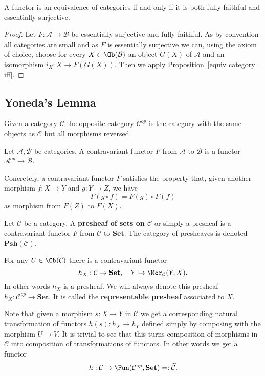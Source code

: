 \begin{corollary}
A functor is an equivalence of categories if and only if it is both fully faithful and essentially surjective.
\end{corollary}
\begin{proof}
Let $F:\mathcal{A}\to\mathcal{B}$ be essentially surjective and fully faithful. As by convention all categories are small and as $F$ is essentially surjective we can, using the axiom of choice, choose for every $X\in\Ob(\mathcal{B})$ an object $G(X)$ of $\mathcal{A}$ and an isomorphism $i_X:X\to F(G(X))$. Then we apply Proposition~\ref{equiv category iff}.
\end{proof}
\subsection{Yoneda's Lemma}
\begin{definition}
Given a category $\mathcal{C}$ the opposite category $\mathcal{C}^{op}$ is the category with the same objects as $\mathcal{C}$ but all morphisms reversed.
\end{definition}
\begin{definition}
Let $\mathcal{A},\mathcal{B}$ be categories. A contravariant functor $F$ from $\mathcal{A}$ to $\mathcal{B}$ is a functor $\mathcal{A}^{op}\to\mathcal{B}$.\par
Concretely, a contravariant functor $F$ satisfies the property that, given another morphism $f:X\to Y$ and $g:Y\to Z$, we have 
\[F(g\circ f)=F(g)\circ F(f)\]
as morphism from $F(Z)$ to $F(X)$.
\end{definition}
\begin{definition}
Let $\mathcal{C}$ be a category. A \textbf{presheaf of sets on $\mathcal{C}$} or simply a presheaf is a contravariant functor $F$ from $\mathcal{C}$ to $\mathbf{Set}$. The category of presheaves is denoted $\mathbf{Psh}(\mathcal{C})$.
\end{definition}
\begin{example}
For any $U\in\Ob(\mathcal{C})$ there is a contravariant functor
\[h_X:\mathcal{C}\to\mathbf{Set},\quad Y\mapsto\Mor_{\mathcal{C}}(Y,X).\]
In other words $h_X$ is a presheaf. We will always denote this presheaf $h_X:\mathcal{C}^{op}\to\mathbf{Set}$. It is called the \textbf{representable presheaf} associated to $X$.\par
Note that given a morphism $s:X\to Y$ in $\mathcal{C}$ we get a corresponding natural transformation of functors $h(s):h_X\to h_Y$ defined simply by composing with the morphism $U\to V$. It is trivial to see that this turns composition of morphisms in $\mathcal{C}$ into composition of transformations of functors. In other words we get a functor
\[h:\mathcal{C}\to\Fun(\mathcal{C}^{op},\mathbf{Set})=:\widehat{\mathcal{C}}.\]
\end{example}

